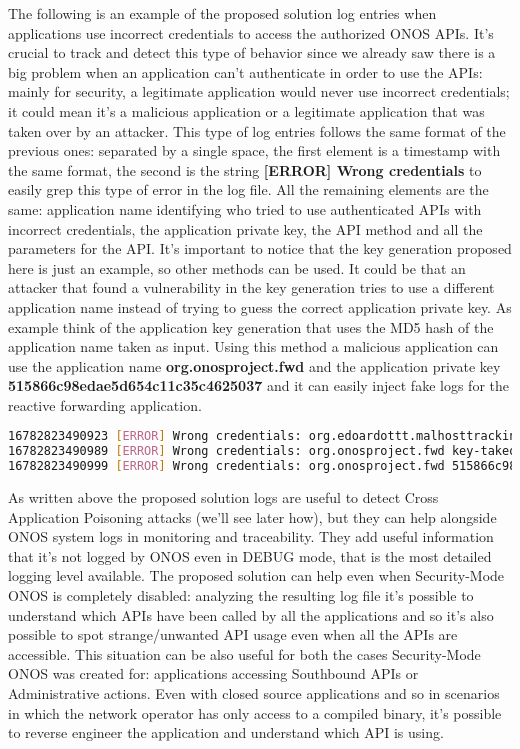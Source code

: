 \documentclass[a4paper,10pt]{memoir}
\begin{document}
The following is an example of the proposed solution log entries when applications use incorrect credentials to access the authorized ONOS APIs. It's crucial to track and detect this type of behavior since we already saw there is a big problem when an application can't authenticate in order to use the APIs: mainly for security, a legitimate application would never use incorrect credentials; it could mean it's a malicious application or a legitimate application that was taken over by an attacker. This type of log entries follows the same format of the previous ones: separated by a single space, the first element is a timestamp with the same format, the second is the string \textbf{[ERROR] Wrong credentials} to easily grep this type of error in the log file. All the remaining elements are the same: application name identifying who tried to use authenticated APIs with incorrect credentials, the application private key, the API method and all the parameters for the API. It's important to notice that the key generation proposed here is just an example, so other methods can be used. It could be that an attacker that found a vulnerability in the key generation tries to use a different application name instead of trying to guess the correct application private key. As example think of the application key generation that uses the MD5 hash of the application name taken as input. Using this method a malicious application can use the application name \textbf{org.onosproject.fwd} and the application private key \textbf{515866c98edae5d654c11c35c4625037} and it can easily inject fake logs for the reactive forwarding application.
\begin{lstlisting}[language=bash]
16782823490923 [ERROR] Wrong credentials: org.edoardottt.malhosttracking.app skbwufuiwfuiwehfuiwwh appendLocation 00:00:00:00:00:04/None of:0000000000000004/1
16782823490989 [ERROR] Wrong credentials: org.onosproject.fwd key-takeover-by-attacker forward of:0000000000000004
16782823490999 [ERROR] Wrong credentials: org.onosproject.fwd 515866c98edae5d654c11c35c4625037 getHost of:0000000000000001
\end{lstlisting}

As written above the proposed solution logs are useful to detect Cross Application Poisoning attacks (we'll see later how), but they can help alongside ONOS system logs in monitoring and traceability. They add useful information that it's not logged by ONOS even in DEBUG mode, that is the most detailed logging level available. The proposed solution can help even when Security-Mode ONOS is completely disabled: analyzing the resulting log file it's possible to understand which APIs have been called by all the applications and so it's also possible to spot strange/unwanted API usage even when all the APIs are accessible. This situation can be also useful for both the cases Security-Mode ONOS was created for: applications accessing Southbound APIs or Administrative actions. Even with closed source applications and so in scenarios in which the network operator has only access to a compiled binary, it's possible to reverse engineer the application and understand which API is using.
\end{document}
